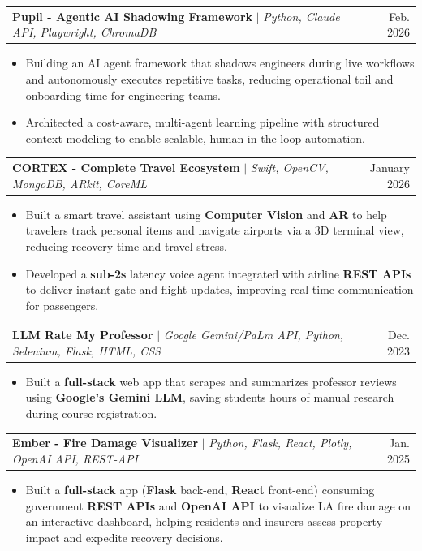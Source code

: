 \documentclass[letterpaper,10pt]{article}
\makeatletter
\newcommand{\resumeItem}[1]{
  \item\small{
    {#1 \vspace{-1.5pt}}
  }
}
\newcommand{\resumeProjectHeading}[2]{
    \item
    \begin{tabular*}{0.97\textwidth}{l@{\extracolsep{\fill}}r}
      \small#1 & #2 \\
    \end{tabular*}\vspace{-6pt}
}
\newcommand{\resumeItemListStart}{\begin{itemize}[itemsep=0pt]}
\newcommand{\resumeItemListEnd}{\end{itemize}\vspace{-4pt}}
\makeatother
\begin{document}
    \resumeProjectHeading
          {\textbf{Pupil - Agentic AI Shadowing Framework} $|$ \emph{Python, Claude API, Playwright, ChromaDB}}{Feb. 2026}
          \resumeItemListStart
            \resumeItem{Building an AI agent framework that shadows engineers during live workflows and autonomously executes repetitive tasks, reducing operational toil and onboarding time for engineering teams.}
            \resumeItem{Architected a cost-aware, multi-agent learning pipeline with structured context modeling to enable scalable, human-in-the-loop automation.}
          \resumeItemListEnd

    \resumeProjectHeading
          {\textbf{CORTEX - Complete Travel Ecosystem} $|$ \emph{Swift, OpenCV, MongoDB, ARkit, CoreML}}{January 2026}
          \resumeItemListStart
            \resumeItem{Built a smart travel assistant using \textbf{Computer Vision} and \textbf{AR} to help travelers track personal items and navigate airports via a 3D terminal view, reducing recovery time and travel stress.}
            \resumeItem{Developed a \textbf{sub-2s} latency voice agent integrated with airline \textbf{REST APIs} to deliver instant gate and flight updates, improving real-time communication for passengers.}
          \resumeItemListEnd

    \resumeProjectHeading
          {\textbf{LLM Rate My Professor} $|$ \emph{Google Gemini/PaLm API, Python, Selenium, Flask, HTML, CSS}}{Dec. 2023}
          \resumeItemListStart
            \resumeItem{Built a \textbf{full-stack} web app that scrapes and summarizes professor reviews using \textbf{Google's Gemini LLM}, saving students hours of manual research during course registration.}
          \resumeItemListEnd

    \resumeProjectHeading
    {\textbf{Ember - Fire Damage Visualizer} $|$ \emph{Python, Flask, React, Plotly, OpenAI API, REST-API}}{Jan. 2025}
    \resumeItemListStart
      \resumeItem{Built a \textbf{full-stack} app (\textbf{Flask} back-end, \textbf{React} front-end) consuming government \textbf{REST APIs} and \textbf{OpenAI API} to visualize LA fire damage on an interactive dashboard, helping residents and insurers assess property impact and expedite recovery decisions.}
    \resumeItemListEnd


    

\end{document}
